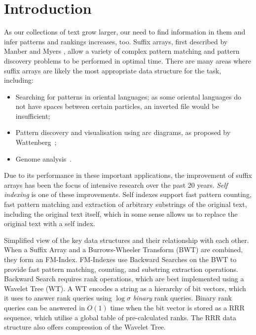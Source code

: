 \section{Introduction}

As our collections of text grow larger, our need to find information in them
and infer patterns and rankings increases, too. Suffix arrays, first
described by Manber and Myers \cite{manber1993}, allow a variety of complex 
pattern matching and pattern discovery problems to be performed in optimal time. 
There are many areas where suffix arrays are likely the most appropriate data 
structure for the task, including:

\begin{itemize}
\item
	Searching for patterns in oriental languages; as some oriental languages
    do not have spaces between certain particles, an inverted file would be
    insufficient;
\item
	Pattern discovery and visualisation using arc diagrams, as proposed by
    Wattenberg~\cite{wattenberg2002};
\item
	Genome analysis~\cite{abouelhoda2004, flicek2009}.
\end{itemize}

Due to its performance in these important applications, the improvement of 
suffix arrays has been the focus of intensive research over the past 20 years. 
\emph{Self indexing} is one of these improvements. Self indexes support 
fast pattern counting, fast pattern matching and extraction of arbitrary 
substrings of the original text, including the original text itself, which in 
some sense allows us to replace the original text with a self index.

	{Simplified view of the key data structures and their relationship
	with each other. When a Suffix Array and a Burrows-Wheeler 
	Transform (BWT) are combined, they form an FM-Index. FM-Indexes use 
	Backward Searches on the BWT to provide fast pattern 
	matching, counting, and substring extraction operations. Backward
	Search requires rank operations, which are best implemented using
	a Wavelet Tree (WT). A WT encodes a string as a hierarchy of bit vectors, 
	which it uses to answer rank queries using $\log \sigma$ \emph{binary} rank 
	queries. Binary rank queries can be answered in $O(1)$ time when the bit 
	vector is stored as a RRR sequence, which utilise a global table of 
	pre-calculated ranks. The RRR data structure also offers compression of the 
	Wavelet Tree.}

